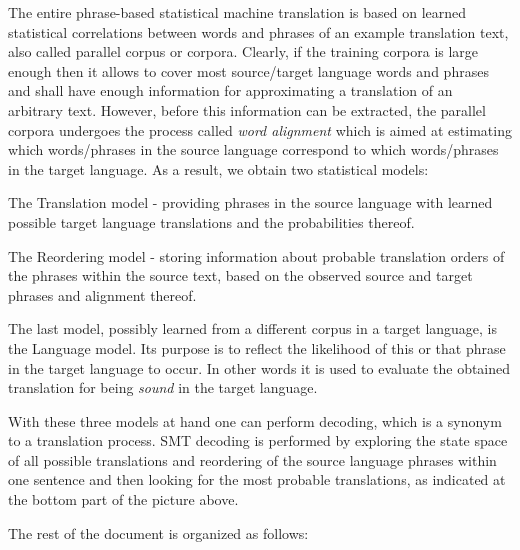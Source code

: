 The entire phrase-\/based statistical machine translation is based on learned statistical correlations between words and phrases of an example translation text, also called parallel corpus or corpora. Clearly, if the training corpora is large enough then it allows to cover most source/target language words and phrases and shall have enough information for approximating a translation of an arbitrary text. However, before this information can be extracted, the parallel corpora undergoes the process called {\itshape word alignment} which is aimed at estimating which words/phrases in the source language correspond to which words/phrases in the target language. As a result, we obtain two statistical models\+:


\begin{DoxyEnumerate}
\item The Translation model -\/ providing phrases in the source language with learned possible target language translations and the probabilities thereof.
\item The Reordering model -\/ storing information about probable translation orders of the phrases within the source text, based on the observed source and target phrases and alignment thereof.
\end{DoxyEnumerate}

The last model, possibly learned from a different corpus in a target language, is the Language model. Its purpose is to reflect the likelihood of this or that phrase in the target language to occur. In other words it is used to evaluate the obtained translation for being {\itshape sound} in the target language.

With these three models at hand one can perform decoding, which is a synonym to a translation process. S\+M\+T decoding is performed by exploring the state space of all possible translations and reordering of the source language phrases within one sentence and then looking for the most probable translations, as indicated at the bottom part of the picture above.

The rest of the document is organized as follows\+:


